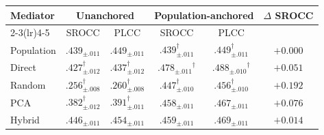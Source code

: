 \begin{tabular}{l cc cc c}
\toprule
\multirow{2}{*}{Mediator} & \multicolumn{2}{c}{Unanchored} & \multicolumn{2}{c}{Population-anchored} & \multirow{2}{*}{$\Delta$ SROCC} \\
\cmidrule(lr){2-3}\cmidrule(lr){4-5}
& SROCC & PLCC & SROCC & PLCC & \\
\midrule
Population & $.439_{\pm .011}$ & $.449_{\pm .011}$ & $.439_{\pm .011}^{\dagger}$ & $.449_{\pm .011}^{\dagger}$ & $+0.000$ \\
Direct & $.427_{\pm .012}^{\dagger}$ & $.437_{\pm .012}^{\dagger}$ & $\bm{.478_{\pm .011}}^{\dagger}$ & $\bm{.488_{\pm .010}}^{\dagger}$ & $+0.051$ \\
Random & $.256_{\pm .008}^{\dagger}$ & $.260_{\pm .008}^{\dagger}$ & $.447_{\pm .010}^{\dagger}$ & $.456_{\pm .010}^{\dagger}$ & $+0.192$ \\
PCA & $.382_{\pm .012}^{\dagger}$ & $.391_{\pm .011}^{\dagger}$ & $.458_{\pm .011}$ & $.467_{\pm .011}$ & $+0.076$ \\
Hybrid & $\bm{.446_{\pm .011}}$ & $\bm{.454_{\pm .011}}$ & $.459_{\pm .011}$ & $.469_{\pm .011}$ & $+0.014$ \\
\bottomrule
\end{tabular}


